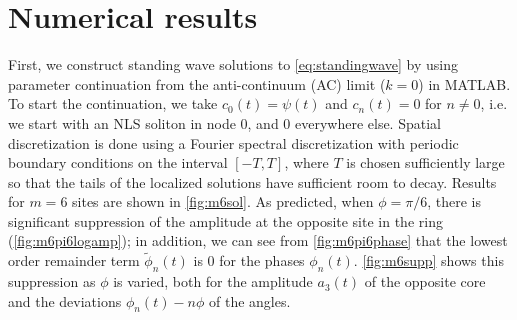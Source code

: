 \documentclass[11pt,reqno]{amsart}
\begin{document}
\section{Numerical results}\label{sec:numerics}

First, we construct standing wave solutions to \cref{eq:standingwave} by using parameter continuation from the anti-continuum (AC) limit ($k=0$) in MATLAB. To start the continuation, we take $c_0(t) = \psi(t)$ and $c_n(t) = 0$ for $n \neq 0$, i.e. we start with an NLS soliton in node 0, and 0 everywhere else. Spatial discretization is done using a Fourier spectral discretization with periodic boundary conditions on the interval $[-T,T]$, where $T$ is chosen sufficiently large so that the tails of the localized solutions have sufficient room to decay. Results for $m=6$ sites are shown in \cref{fig:m6sol}. As predicted, when $\phi=\pi/6$, there is significant suppression of the amplitude at the opposite site in the ring (\cref{fig:m6pi6logamp}); in addition, we can see from \cref{fig:m6pi6phase} that the lowest order remainder term $\tilde{\phi}_n(t)$ is 0 for the phases $\phi_n(t)$. \cref{fig:m6supp} shows this suppression as $\phi$ is varied, both for the amplitude $a_3(t)$ of the opposite core and the deviations $\phi_n(t) - n \phi$ of the angles.
\end{document}
